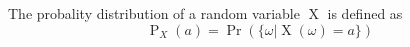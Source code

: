The probality distribution of a random variable $\operatorname{X}$ is defined as
$$\operatorname{P}_X(a) = \operatorname{Pr}(\{\omega | \operatorname{X}(\omega) = a\})$$
